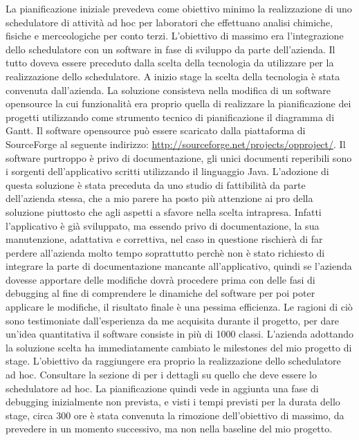 La pianificazione iniziale prevedeva come obiettivo minimo la realizzazione di uno schedulatore di attivit\`{a} ad hoc per laboratori che effettuano analisi chimiche, fisiche e merceologiche per conto terzi. L\textquoteright{}obiettivo di massimo era l\textquoteright{}integrazione dello schedulatore con un software in fase di sviluppo da parte dell\textquoteright{}azienda. Il tutto doveva essere preceduto dalla scelta della tecnologia da utilizzare per la realizzazione dello schedulatore.
A inizio stage la scelta della tecnologia \`{e} stata convenuta dall\textquoteright{}azienda. La soluzione consisteva nella modifica di un software opensource la cui funzionalit\`{a} era proprio quella di realizzare la pianificazione dei progetti utilizzando come strumento tecnico di pianificazione il diagramma di Gantt. Il software opensource pu\`{o} essere scaricato dalla piattaforma di SourceForge al seguente indirizzo: \url{http://sourceforge.net/projects/opproject/}.
Il software purtroppo \`{e} privo di documentazione, gli unici documenti reperibili sono i sorgenti dell\textquoteright{}applicativo scritti utilizzando il linguaggio Java. L\textquoteright{}adozione di questa soluzione \`{e} stata preceduta da uno studio di fattibilit\`{a} da parte dell\textquoteright{}azienda stessa, che a mio parere ha posto pi\`{u} attenzione ai pro della soluzione piuttosto che agli aspetti a sfavore nella scelta intrapresa. Infatti l\textquoteright{}applicativo \`{e} gi\`{a} sviluppato, ma essendo privo di documentazione, la sua manutenzione, adattativa e correttiva, nel caso in questione rischier\`{a} di far perdere all\textquoteright{}azienda molto tempo soprattutto perch\`{e} non \`{e} stato richiesto di integrare la parte di documentazione mancante all\textquoteright{}applicativo, quindi se l\textquoteright{}azienda dovesse apportare delle modifiche dovr\`{a} procedere prima con delle fasi di debugging al fine di comprendere le dinamiche del software per poi poter applicare le modifiche, il risultato finale \`{e} una pessima efficienza. Le ragioni di ci\`{o} sono testimoniate dall\textquoteright{}esperienza da me acquisita durante il progetto, per dare un\textquoteright{}idea quantitativa il software consiste in pi\`{u} di 1000 classi.
L\textquoteright{}azienda adottando la soluzione scelta ha immediatamente cambiato le milestones del mio progetto di stage. L\textquoteright{}obiettivo da raggiungere era proprio la realizzazione dello schedulatore ad hoc. Consultare la sezione di  per i dettagli su quello che deve essere lo schedulatore ad hoc. La pianificazione quindi vede in aggiunta una fase di debugging inizialmente non prevista, e visti i tempi previsti per la durata dello stage, circa 300 ore \`{e} stata convenuta la rimozione dell\textquoteright{}obiettivo di massimo, da prevedere in un momento successivo, ma non nella baseline del mio progetto.